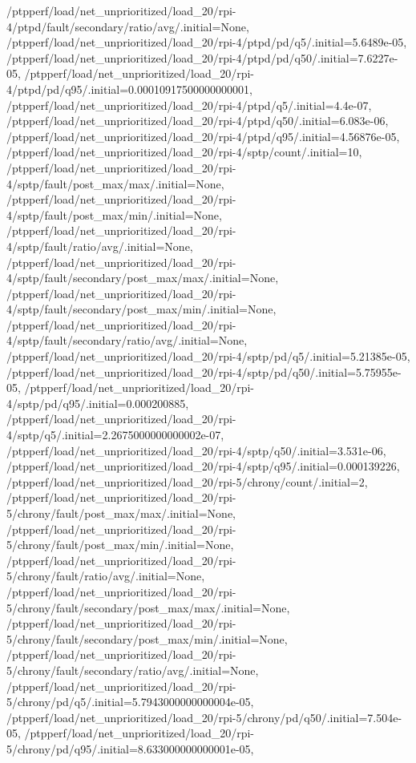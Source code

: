 {    /ptpperf/load/net_unprioritized/load_20/rpi-4/ptpd/fault/secondary/ratio/avg/.initial=None,
    /ptpperf/load/net_unprioritized/load_20/rpi-4/ptpd/pd/q5/.initial=5.6489e-05,
    /ptpperf/load/net_unprioritized/load_20/rpi-4/ptpd/pd/q50/.initial=7.6227e-05,
    /ptpperf/load/net_unprioritized/load_20/rpi-4/ptpd/pd/q95/.initial=0.00010917500000000001,
    /ptpperf/load/net_unprioritized/load_20/rpi-4/ptpd/q5/.initial=4.4e-07,
    /ptpperf/load/net_unprioritized/load_20/rpi-4/ptpd/q50/.initial=6.083e-06,
    /ptpperf/load/net_unprioritized/load_20/rpi-4/ptpd/q95/.initial=4.56876e-05,
    /ptpperf/load/net_unprioritized/load_20/rpi-4/sptp/count/.initial=10,
    /ptpperf/load/net_unprioritized/load_20/rpi-4/sptp/fault/post_max/max/.initial=None,
    /ptpperf/load/net_unprioritized/load_20/rpi-4/sptp/fault/post_max/min/.initial=None,
    /ptpperf/load/net_unprioritized/load_20/rpi-4/sptp/fault/ratio/avg/.initial=None,
    /ptpperf/load/net_unprioritized/load_20/rpi-4/sptp/fault/secondary/post_max/max/.initial=None,
    /ptpperf/load/net_unprioritized/load_20/rpi-4/sptp/fault/secondary/post_max/min/.initial=None,
    /ptpperf/load/net_unprioritized/load_20/rpi-4/sptp/fault/secondary/ratio/avg/.initial=None,
    /ptpperf/load/net_unprioritized/load_20/rpi-4/sptp/pd/q5/.initial=5.21385e-05,
    /ptpperf/load/net_unprioritized/load_20/rpi-4/sptp/pd/q50/.initial=5.75955e-05,
    /ptpperf/load/net_unprioritized/load_20/rpi-4/sptp/pd/q95/.initial=0.000200885,
    /ptpperf/load/net_unprioritized/load_20/rpi-4/sptp/q5/.initial=2.2675000000000002e-07,
    /ptpperf/load/net_unprioritized/load_20/rpi-4/sptp/q50/.initial=3.531e-06,
    /ptpperf/load/net_unprioritized/load_20/rpi-4/sptp/q95/.initial=0.000139226,
    /ptpperf/load/net_unprioritized/load_20/rpi-5/chrony/count/.initial=2,
    /ptpperf/load/net_unprioritized/load_20/rpi-5/chrony/fault/post_max/max/.initial=None,
    /ptpperf/load/net_unprioritized/load_20/rpi-5/chrony/fault/post_max/min/.initial=None,
    /ptpperf/load/net_unprioritized/load_20/rpi-5/chrony/fault/ratio/avg/.initial=None,
    /ptpperf/load/net_unprioritized/load_20/rpi-5/chrony/fault/secondary/post_max/max/.initial=None,
    /ptpperf/load/net_unprioritized/load_20/rpi-5/chrony/fault/secondary/post_max/min/.initial=None,
    /ptpperf/load/net_unprioritized/load_20/rpi-5/chrony/fault/secondary/ratio/avg/.initial=None,
    /ptpperf/load/net_unprioritized/load_20/rpi-5/chrony/pd/q5/.initial=5.7943000000000004e-05,
    /ptpperf/load/net_unprioritized/load_20/rpi-5/chrony/pd/q50/.initial=7.504e-05,
    /ptpperf/load/net_unprioritized/load_20/rpi-5/chrony/pd/q95/.initial=8.633000000000001e-05,
}
